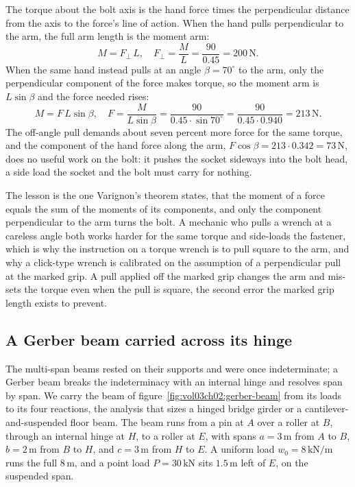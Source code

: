 The torque about the bolt axis is the hand force times the perpendicular
distance from the axis to the force's line of action. When the hand pulls
perpendicular to the arm, the full arm length is the moment arm:
\[
M = F_\perp\,L, \quad
F_\perp = \frac{M}{L} = \frac{90}{0.45} = 200\,\text{N}.
\]
When the same hand instead pulls at an angle $\beta = 70^\circ$ to the arm,
only the perpendicular component of the force makes torque, so the moment
arm is $L\sin\beta$ and the force needed rises:
\[
M = F\,L\sin\beta, \quad
F = \frac{M}{L\sin\beta} = \frac{90}{0.45\cdot\sin 70^\circ}
= \frac{90}{0.45\cdot 0.940} = 213\,\text{N}.
\]
The off-angle pull demands about seven percent more force for the same
torque, and the component of the hand force along the arm,
$F\cos\beta = 213\cdot 0.342 = 73\,\text{N}$, does no useful work on the
bolt: it pushes the socket sideways into the bolt head, a side load the
socket and the bolt must carry for nothing.

The lesson is the one Varignon's theorem states, that the moment of a force
equals the sum of the moments of its components, and only the component
perpendicular to the arm turns the bolt. A mechanic who pulls a wrench at a
careless angle both works harder for the same torque and side-loads the
fastener, which is why the instruction on a torque wrench is to pull square
to the arm, and why a click-type wrench is calibrated on the assumption of a
perpendicular pull at the marked grip. A pull applied off the marked grip
changes the arm and mis-sets the torque even when the pull is square, the
second error the marked grip length exists to prevent.

\subsection{A Gerber beam carried across its hinge}

The multi-span beams rested on their supports and were once indeterminate; a
Gerber beam breaks the indeterminacy with an internal hinge and resolves span
by span. We carry the beam of figure~\ref{fig:vol03ch02:gerber-beam} from its
loads to its four reactions, the analysis that sizes a hinged bridge girder or
a cantilever-and-suspended floor beam. The beam runs from a pin at $A$ over a
roller at $B$, through an internal hinge at $H$, to a roller at $E$, with spans
$a = 3\,\si{\meter}$ from $A$ to $B$, $b = 2\,\si{\meter}$ from $B$ to $H$, and
$c = 3\,\si{\meter}$ from $H$ to $E$. A uniform load $w_0 = 8\,\text{kN}/\text{m}$
runs the full $8\,\si{\meter}$, and a point load $P = 30\,\text{kN}$ sits
$1.5\,\si{\meter}$ left of $E$, on the suspended span.


